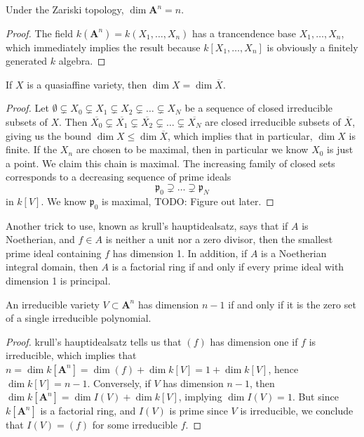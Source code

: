\begin{theorem}
    Under the Zariski topology, $\dim \mathbf{A}^n = n$.
\end{theorem}
\begin{proof}
    The field $k(\mathbf{A}^n) = k(X_1, \dots, X_n)$ has a trancendence base $X_1, \dots, X_n$, which immediately implies the result because $k[X_1, \dots, X_n]$ is obviously a finitely generated $k$ algebra.
\end{proof}

\begin{theorem}
    If $X$ is a quasiaffine variety, then $\dim X = \dim \overline{X}$.
\end{theorem}
\begin{proof}
    Let $\emptyset \subsetneq X_0 \subsetneq X_1 \subsetneq X_2 \subsetneq \dots \subsetneq X_N$ be a sequence of closed irreducible subsets of $X$. Then $\overline{X_0} \subsetneq \overline{X_1} \subsetneq \overline{X_2} \subsetneq \dots \subsetneq \overline{X_N}$ are closed irreducible subsets of $\overline{X}$, giving us the bound $\dim X \leq \dim \overline{X}$, which implies that in particular, $\dim X$ is finite. If the $X_n$ are chosen to be maximal, then in particular we know $X_0$ is just a point. We claim this chain is maximal. The increasing family of closed sets corresponds to a decreasing sequence of prime ideals
    \[ \mathfrak{p}_0 \supsetneq \dots \supsetneq \mathfrak{p}_N \]
    in $k[V]$. We know $\mathfrak{p}_0$ is maximal, TODO: Figure out later.
\end{proof}

Another trick to use, known as krull's hauptidealsatz, says that if $A$ is Noetherian, and $f \in A$ is neither a unit nor a zero divisor, then the smallest prime ideal containing $f$ has dimension 1. In addition, if $A$ is a Noetherian integral domain, then $A$ is a factorial ring if and only if every prime ideal with dimension 1 is principal.

\begin{theorem}
    An irreducible variety $V \subset \mathbf{A}^n$ has dimension $n-1$ if and only if it is the zero set of a single irreducible polynomial.
\end{theorem}
\begin{proof}
    krull's hauptidealsatz tells us that $(f)$ has dimension one if $f$ is irreducible, which implies that $n = \dim k[\mathbf{A}^n] = \dim (f) + \dim k[V] = 1 + \dim k[V]$, hence $\dim k[V] = n-1$. Conversely, if $V$ has dimension $n-1$, then $\dim k[\mathbf{A}^n] = \dim I(V) + \dim k[V]$, implying $\dim I(V) = 1$. But since $k[\mathbf{A}^n]$ is a factorial ring, and $I(V)$ is prime since $V$ is irreducible, we conclude that $I(V) = (f)$ for some irreducible $f$.
\end{proof}

